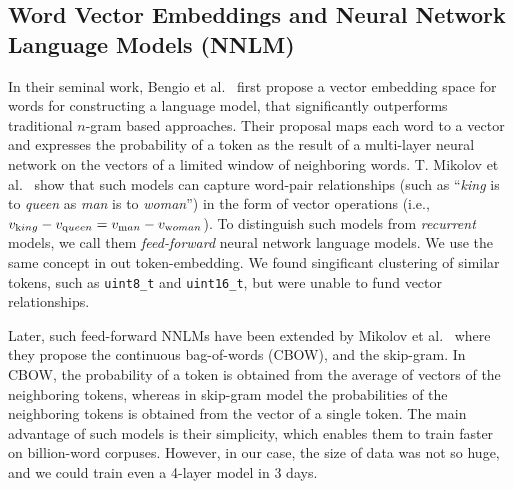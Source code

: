\subsection{Word Vector Embeddings and Neural Network Language Models (NNLM)}
In their seminal work, Bengio et al.~\cite{ref:embedding} first propose a
vector embedding space for words for constructing a language model,
that significantly outperforms traditional $n$-gram based
approaches. Their proposal maps each word to a vector and expresses the
probability of a token as the result of a multi-layer neural network on the
vectors of a limited window of neighboring words. T. Mikolov
et al.~ \cite{ref:regularities} show that such models can capture word-pair relationships
(such as ``{\em king} is to {\em queen} as {\em man} is to {\em woman}'') in
the form of vector operations (i.e., $v_{\text king} -
v_{\text queen} = v_{\text man} - v_{\text woman}$). To distinguish such models
from {\it recurrent} models, we
call them {\it feed-forward} neural network language models.
We use the same concept in out token-embedding. We found singificant clustering
of similar tokens, such as {\tt uint8\_t} and {\tt uint16\_t}, but were unable
to fund vector relationships.

Later, such feed-forward NNLMs have been extended by Mikolov et
al.~\cite{ref:mikolov:wvec} where they propose the continuous
bag-of-words (CBOW), and the skip-gram. In CBOW, the probability of a token is
obtained from the average of vectors of the neighboring tokens, whereas in
skip-gram model the probabilities of the neighboring tokens is obtained from the
vector of a single token. The main advantage of such models is their
simplicity, which enables them to train
faster on billion-word corpuses. However, in our case, the size of data was not
so huge, and we could train even a 4-layer model in 3 days.

